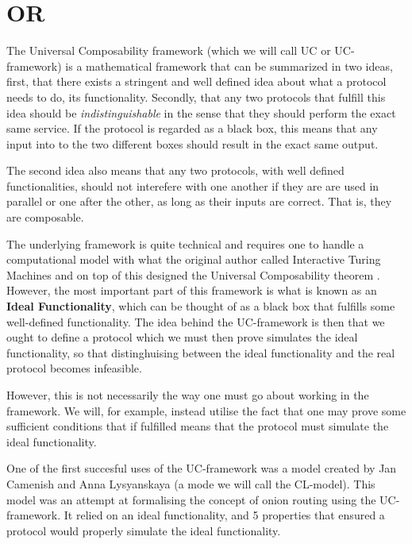 \section{ \acl*{OR}}%
\label{UCOR}
The Universal Composability framework (which we will call UC or
UC-framework) is a mathematical framework that can be summarized in
two ideas, first, that there exists a stringent and well defined idea
about what a protocol needs to do, its functionality. Secondly, that
any two protocols that fulfill this idea should be {\it
  indistinguishable\/} in the sense that they should perform the exact
same service\cite{UC-framework}. If the protocol is regarded as a black box, this means
that any input into to the two different boxes should result in the
exact same output.

The second idea also means that any two protocols, with well defined
functionalities, should not interefere with one another if they are
are used in parallel or one after the other, as long as their inputs
are correct. That is, they are composable\cite{UC-framework}.

The underlying framework is quite technical and requires one to handle
a computational model with what the original author %
called Interactive Turing Machines and on top of this designed the
Universal Composability theorem \cite{UC-framework}. However, the most important part of
this framework is what is known as an {\bf Ideal Functionality}, which
can be thought of as a black box that fulfills some well-defined
functionality\cite{UC-framework}. The idea behind the UC-framework is then that we ought
to define a protocol which we must then prove simulates the ideal
functionality, so that distinghuising between the ideal functionality
and the real protocol becomes infeasible.

However, this is not necessarily the way one must go about working in
the framework. We will, for example, instead utilise the fact that one
may prove some sufficient conditions that if fulfilled means that the
protocol must simulate the ideal functionality.

One of the first succesful uses of the UC-framework was a model
created by Jan Camenish and Anna Lysyanskaya (a mode we will call the
CL-model). This model was an attempt at formalising the concept of
onion routing using the UC-framework. It relied on an ideal
functionality, and 5 properties that ensured a protocol would properly
simulate the ideal functionality\cite{CL-model}.

